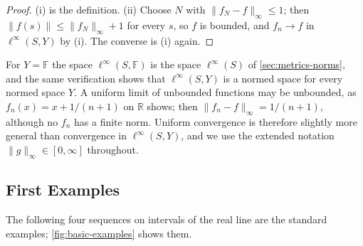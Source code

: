 \begin{proof}
(i) is the definition. (ii) Choose $N$ with $\|f_N-f\|_\infty\le1$; then $\|f(s)\|\le\|f_N\|_\infty+1$ for every $s$, so $f$ is bounded, and $f_n\to f$ in $\ell^\infty(S,Y)$ by (i). The converse is (i) again.
\end{proof}

For $Y=\mathbb F$ the space $\ell^\infty(S,\mathbb F)$ is the space $\ell^\infty(S)$ of \cref{sec:metrics-norms}, and the same verification shows that $\ell^\infty(S,Y)$ is a normed space for every normed space $Y$. A uniform limit of unbounded functions may be unbounded, as $f_n(x)=x+1/(n+1)$ on $\mathbb R$ shows; then $\|f_n-f\|_\infty=1/(n+1)$, although no $f_n$ has a finite norm. Uniform convergence is therefore slightly more general than convergence in $\ell^\infty(S,Y)$, and we use the extended notation $\|g\|_\infty\in[0,\infty]$ throughout.

\subsection{First Examples}

The following four sequences on intervals of the real line are the standard examples; \cref{fig:basic-examples} shows them.

